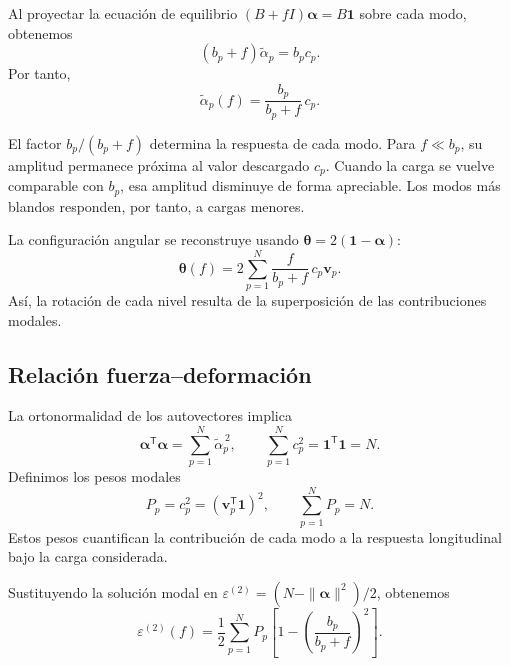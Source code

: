 \documentclass[11pt,a4paper]{article}
\begin{document}
Al proyectar la ecuación de equilibrio
$(B+fI)\boldsymbol{\alpha}=B\mathbf1$
sobre cada modo, obtenemos
\begin{equation}
(b_p+f)\widetilde{\alpha}_p=b_pc_p.
\end{equation}
Por tanto,
\begin{equation}
\boxed{
\widetilde{\alpha}_p(f)
=
\frac{b_p}{b_p+f}\,c_p.
}
\label{eq:modal_filter}
\end{equation}

El factor $b_p/(b_p+f)$ determina la respuesta de cada modo.
Para $f\ll b_p$, su amplitud permanece próxima al valor
descargado $c_p$. Cuando la carga se vuelve comparable con
$b_p$, esa amplitud disminuye de forma apreciable.
Los modos más blandos responden, por tanto, a cargas menores.

La configuración angular se reconstruye usando
$\boldsymbol{\theta}=2(\mathbf1-\boldsymbol{\alpha})$:
\begin{equation}
\boxed{
\boldsymbol{\theta}(f)
=
2\sum_{p=1}^{N}
\frac{f}{b_p+f}\,c_p\mathbf v_p.
}
\label{eq:theta_modal}
\end{equation}
Así, la rotación de cada nivel resulta de la superposición
de las contribuciones modales.

\subsection{Relación fuerza--deformación}

La ortonormalidad de los autovectores implica
\begin{equation}
\boldsymbol{\alpha}^{\mathsf T}\boldsymbol{\alpha}
=
\sum_{p=1}^{N}\widetilde{\alpha}_p^{\,2},
\qquad
\sum_{p=1}^{N}c_p^2
=
\mathbf1^{\mathsf T}\mathbf1=N.
\end{equation}
Definimos los pesos modales
\begin{equation}
P_p=c_p^2
=
\left(\mathbf v_p^{\mathsf T}\mathbf1\right)^2,
\qquad
\sum_{p=1}^{N}P_p=N.
\label{eq:modal_weights}
\end{equation}
Estos pesos cuantifican la contribución de cada modo a la
respuesta longitudinal bajo la carga considerada.

Sustituyendo la solución modal en
$\varepsilon^{(2)}=(N-\|\boldsymbol{\alpha}\|^2)/2$,
obtenemos
\begin{equation}
\boxed{
\varepsilon^{(2)}(f)
=
\frac12
\sum_{p=1}^{N}P_p
\left[
1-
\left(\frac{b_p}{b_p+f}\right)^2
\right].
}
\label{eq:strain_modal}
\end{equation}
\end{document}
